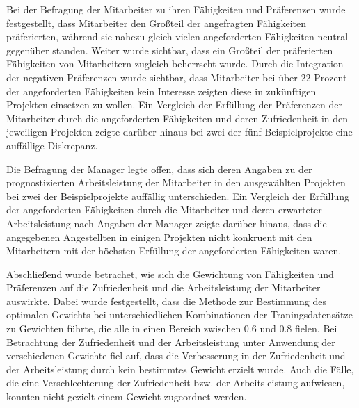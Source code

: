 Bei der Befragung der Mitarbeiter zu ihren Fähigkeiten und Präferenzen wurde festgestellt, dass Mitarbeiter den Großteil der angefragten Fähigkeiten präferierten, während sie nahezu gleich vielen angeforderten Fähigkeiten neutral gegenüber standen.
Weiter wurde sichtbar, dass ein Großteil der präferierten Fähigkeiten von Mitarbeitern zugleich beherrscht wurde.
Durch die Integration der negativen Präferenzen wurde sichtbar, dass Mitarbeiter bei über 22 Prozent der angeforderten Fähigkeiten kein Interesse zeigten diese in zukünftigen Projekten einsetzen zu wollen.
Ein Vergleich der Erfüllung der Präferenzen der Mitarbeiter durch die angeforderten Fähigkeiten und deren Zufriedenheit in den jeweiligen Projekten zeigte darüber hinaus bei zwei der fünf Beispielprojekte eine auffällige Diskrepanz.

Die Befragung der Manager legte offen, dass sich deren Angaben zu der prognostizierten Arbeitsleistung der Mitarbeiter in den ausgewählten Projekten bei zwei der Beispielprojekte auffällig unterschieden. 
Ein Vergleich der Erfüllung der angeforderten Fähigkeiten durch die Mitarbeiter und deren erwarteter Arbeitsleistung nach Angaben der Manager zeigte darüber hinaus, dass die angegebenen Angestellten in einigen Projekten nicht konkruent mit den Mitarbeitern mit der höchsten Erfüllung der angeforderten Fähigkeiten waren.

Abschließend wurde betrachet, wie sich die Gewichtung von Fähigkeiten und Präferenzen auf die Zufriedenheit und die Arbeitsleistung der Mitarbeiter auswirkte.
Dabei wurde festgestellt, dass die Methode zur Bestimmung des optimalen Gewichts bei unterschiedlichen Kombinationen der Traningsdatensätze zu Gewichten führte, die alle in einen Bereich zwischen 0.6 und 0.8 fielen.
Bei Betrachtung der Zufriedenheit und der Arbeitsleistung unter Anwendung der verschiedenen Gewichte fiel auf, dass die Verbesserung in der Zufriedenheit und der Arbeitsleistung durch kein bestimmtes Gewicht erzielt wurde.
Auch die Fälle, die eine Verschlechterung der Zufriedenheit bzw. der Arbeitsleistung aufwiesen, konnten nicht gezielt einem Gewicht zugeordnet werden.

